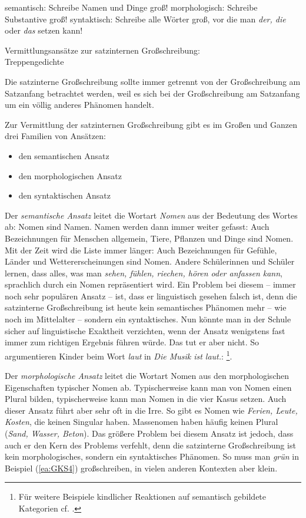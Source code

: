 \ea
\ea \label{ex:semantisch} semantisch: Schreibe Namen und Dinge groß!
\ex \label{ex:morphologisch} morphologisch: Schreibe Substantive groß! 
\ex \label{ex:syntaktisch} syntaktisch: Schreibe alle Wörter groß, vor die man \textit{der, die} oder \textit{das} setzen kann!
\z
\z

\newpage
\begin{Exkurs}{Vermittlungsansätze zur satzinternen Großschreibung:\\ Treppengedichte}
\label{ex:Treppenwoerter}

\noindent Die satzinterne Großschreibung sollte immer getrennt von der Großschreibung am Satzanfang betrachtet werden, weil es sich bei der Großschreibung am Satzanfang um ein völlig anderes Phänomen handelt.

Zur Vermittlung der satzinternen Großschreibung gibt es im Großen und Ganzen drei Familien von Ansätzen:
\begin{itemize}
    \item den semantischen Ansatz
    \item den morphologischen Ansatz
    \item den syntaktischen Ansatz
\end{itemize}

Der \textit{semantische Ansatz} leitet die Wortart \textit{Nomen} aus der Bedeutung des Wortes ab: Nomen sind Namen. Namen werden dann immer weiter gefasst: Auch Bezeichnungen für Menschen allgemein, Tiere, Pflanzen und Dinge sind Nomen. Mit der Zeit wird die Liste immer länger: Auch Bezeichnungen für Gefühle, Länder und Wettererscheinungen sind Nomen. Andere Schülerinnen und Schüler lernen, dass alles, was man \textit{sehen, fühlen, riechen, hören oder anfassen kann}, sprachlich durch ein Nomen repräsentiert wird. Ein Problem bei diesem -- immer noch sehr populären Ansatz -- ist, dass er linguistisch gesehen falsch ist, denn die satzinterne Großschreibung ist heute kein semantisches Phänomen mehr -- wie noch im Mittelalter -- sondern ein syntaktisches. Nun könnte man in der Schule sicher auf linguistische Exaktheit verzichten, wenn der Ansatz wenigstens fast immer zum richtigen Ergebnis führen würde. Das tut er aber nicht. So argumentieren Kinder beim Wort \textit{laut} in \textit{Die Musik ist laut.}: \footnote{Für weitere Beispiele kindlicher Reaktionen auf semantisch gebildete Kategorien cf. \citet{GuentherNuenke2005}.}.

Der \textit{morphologische Ansatz} leitet die Wortart Nomen aus den morphologischen Eigenschaften typischer Nomen ab. Typischerweise kann man von Nomen einen Plural bilden, typischerweise kann man Nomen in die vier Kasus setzen. Auch dieser Ansatz führt aber sehr oft in die Irre. So gibt es Nomen wie \textit{Ferien, Leute, Kosten}, die keinen Singular haben. Massenomen haben häufig keinen Plural (\textit{Sand, Wasser, Beton}). Das größere Problem bei diesem Ansatz ist jedoch, dass auch er den Kern des Problems verfehlt, denn die satzinterne Großschreibung ist kein morphologisches, sondern ein syntaktisches Phänomen. So muss man \textit{grün} in Beispiel (\ref{ea:GKS4}) großschreiben, in vielen anderen Kontexten aber klein.


\end{Exkurs}
